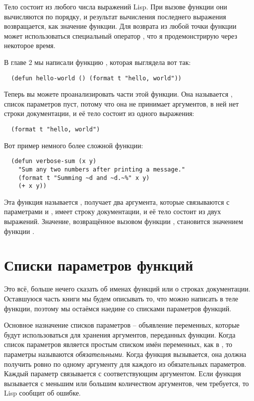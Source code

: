 Тело  состоит из любого числа выражений Lisp.  При вызове функции они
вычисляются по порядку, и результат вычисления последнего выражения возвращается, как
значение функции.  Для возврата из любой точки функции может использоваться специальный
оператор , что я продемонстрирую через некоторое время.

В главе 2 мы написали функцию , которая выглядела вот так:

\begin{lstlisting}
  (defun hello-world () (format t "hello, world"))
\end{lstlisting}

Теперь вы можете проанализировать части этой функции.  Она называется ,
список параметров пуст, потому что она не принимает аргументов, в ней нет строки
документации, и её тело состоит из одного выражения:

\begin{lstlisting}
  (format t "hello, world")
\end{lstlisting}

Вот пример немного более сложной функции:

\begin{lstlisting}
  (defun verbose-sum (x y)
    "Sum any two numbers after printing a message."
    (format t "Summing ~d and ~d.~%" x y)
    (+ x y))
\end{lstlisting}

Эта функция называется , получает два аргумента, которые связываются с
параметрами  и , имеет строку документации, и её тело состоит из двух
выражений.  Значение, возвращённое вызовом функции \code{+}, становится значением функции
.

\section{Списки параметров функций}

Это всё, больше нечего сказать об именах функций или о строках документации. Оставшуюся
часть книги мы будем описывать то, что можно написать в теле функции, поэтому мы остаёмся
наедине со списками параметров функций.

Основное назначение списков параметров -- объявление переменных, которые будут
использоваться для хранения аргументов, переданных функции.  Когда список параметров
является простым списком имён переменных, как в , то параметры
называются \textit{обязательными}.  Когда функция вызывается, она должна получить ровно по
одному аргументу для каждого из обязательных параметров.  Каждый параметр связывается с
соответствующим аргументом.  Если функция вызывается с меньшим или большим количеством
аргументов, чем требуется, то Lisp сообщит об ошибке.

